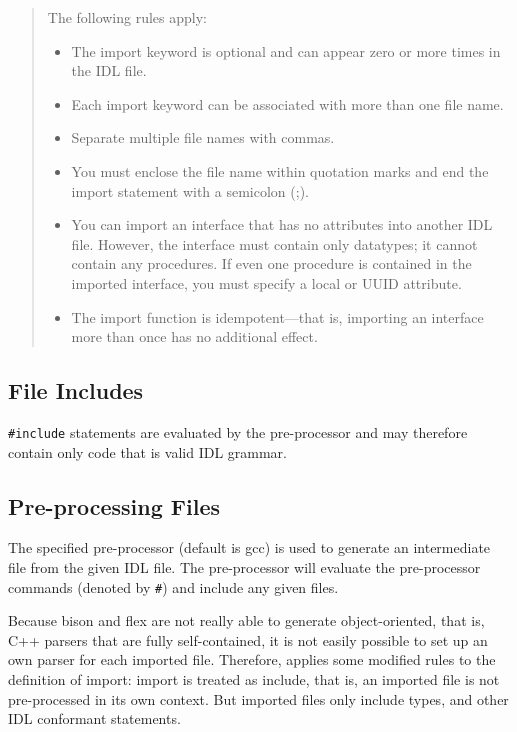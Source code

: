 \begin{quote}
The following rules apply:
\begin{itemize}
\item The import keyword is optional and can appear zero or more times 
      in the IDL file.
\item Each import keyword can be associated with more than one file name.
\item Separate multiple file names with commas.
\item You must enclose the file name within quotation marks and end the 
      import statement with a semicolon (;).
\item You can import an interface that has no attributes into another 
      IDL file. However, the interface must contain only datatypes; it 
      cannot contain any procedures. If even one procedure is contained 
      in the imported interface, you must specify a local or UUID attribute.
\item The import function is idempotent---that is, importing an interface 
      more than once has no additional effect.
\end{itemize}
\end{quote}

\subsection{File Includes}
\verb|#include| statements are evaluated by the pre-processor and may
therefore contain only code that is valid IDL grammar.

\subsection{Pre-processing Files}
The specified pre-processor (default is gcc) is used to generate an 
intermediate file from the given IDL file.  The pre-processor will
evaluate the pre-processor commands (denoted by \verb|#|) and include
any given files.

Because bison and flex are not really able to generate object-oriented,
that is, C++ parsers that are fully self-contained, it is not easily 
possible to set up an own parser for each imported file.  Therefore,
\dice{} applies some modified rules to the definition of import: 
import is treated as include, that is, an imported file is not pre-processed
in its own context.  But imported files only include types, and other
IDL conformant statements.

